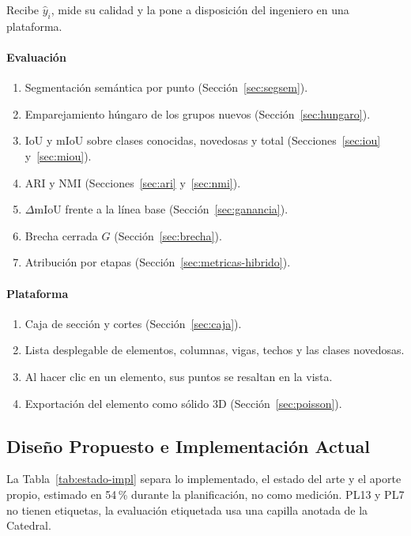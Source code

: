 Recibe $\hat{y}_i$, mide su calidad y la pone a disposición del ingeniero en una
plataforma.

\paragraph*{Evaluación}
\begin{enumerate}\setlength{\itemsep}{1pt}
\item Segmentación semántica por punto (Sección~\ref{sec:segsem}).
\item Emparejamiento húngaro de los grupos nuevos
(Sección~\ref{sec:hungaro}).
\item IoU y mIoU sobre clases conocidas, novedosas y total
(Secciones~\ref{sec:iou} y~\ref{sec:miou}).
\item ARI y NMI (Secciones~\ref{sec:ari} y~\ref{sec:nmi}).
\item $\Delta$mIoU frente a la línea base (Sección~\ref{sec:ganancia}).
\item Brecha cerrada $G$ (Sección~\ref{sec:brecha}).
\item Atribución por etapas (Sección~\ref{sec:metricas-hibrido}).
\end{enumerate}

\paragraph*{Plataforma}
\begin{enumerate}\setlength{\itemsep}{1pt}\setcounter{enumi}{8}
\item Caja de sección y cortes (Sección~\ref{sec:caja}).
\item Lista desplegable de elementos, columnas, vigas, techos y las clases
novedosas.
\item Al hacer clic en un elemento, sus puntos se resaltan en la vista.
\item Exportación del elemento como sólido 3D (Sección~\ref{sec:poisson}).
\end{enumerate}

\subsection{Diseño Propuesto e Implementación Actual}
\label{sec:estado-impl}

La Tabla~\ref{tab:estado-impl} separa lo implementado, el estado del arte y el aporte
propio, estimado en 54\,\% durante la planificación, no como medición. PL13 y PL7 no
tienen etiquetas, la evaluación etiquetada usa una capilla anotada de la Catedral.

